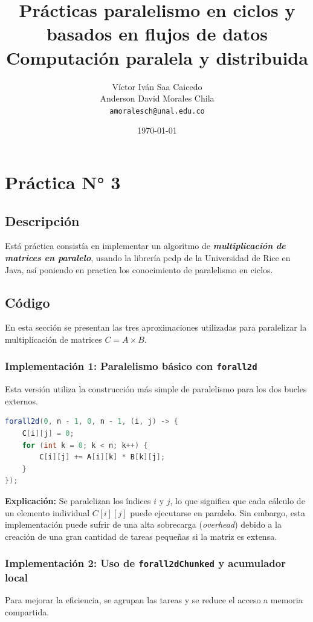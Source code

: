 \documentclass[12pt,a4paper]{article}
\title{
    \vspace{-2cm}
    \textbf{Prácticas paralelismo en ciclos y basados en flujos de datos} \\
    \vspace{0.5cm}
    \large Computación paralela y distribuida
}
\author{
    Víctor Iván Saa Caicedo \\
    Anderson David Morales Chila\\
    \texttt{amoralesch@unal.edu.co}
}
\date{\today}
\begin{document}
\maketitle

\section{Práctica N° 3}
\subsection{Descripción}
Está práctica consistía en implementar un algoritmo de \textit{\textbf{multiplicación de matrices en paralelo}}, usando la librería pcdp de la Universidad de Rice en Java, así poniendo en practica los conocimiento de paralelismo en ciclos.
\subsection{Código}
En esta sección se presentan las tres aproximaciones utilizadas para paralelizar la multiplicación de matrices $C = A \times B$.

\subsubsection{Implementación 1: Paralelismo básico con \texttt{forall2d}}
Esta versión utiliza la construcción más simple de paralelismo para los dos bucles externos.

\begin{lstlisting}[language=Java, caption=Multiplicación de matrices con forall2d.]
forall2d(0, n - 1, 0, n - 1, (i, j) -> {
    C[i][j] = 0;
    for (int k = 0; k < n; k++) {
        C[i][j] += A[i][k] * B[k][j];
    }
});
\end{lstlisting}

\textbf{Explicación:} Se paralelizan los índices $i$ y $j$, lo que significa que cada cálculo de un elemento individual $C[i][j]$ puede ejecutarse en paralelo. Sin embargo, esta implementación puede sufrir de una alta sobrecarga (\textit{overhead}) debido a la creación de una gran cantidad de tareas pequeñas si la matriz es extensa.

\subsubsection{Implementación 2: Uso de \texttt{forall2dChunked} y acumulador local}
Para mejorar la eficiencia, se agrupan las tareas y se reduce el acceso a memoria compartida.
\end{document}
